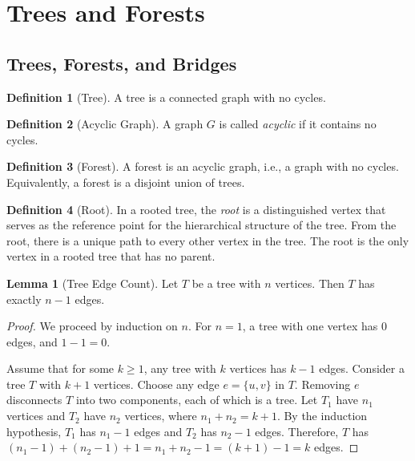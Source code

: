\documentclass{article}
\theoremstyle{definition}
\newtheorem{lemma}{Lemma}
\newtheorem{definition}{Definition}
\begin{document}
\pagebreak
\section{Trees and Forests}

\subsection{Trees, Forests, and Bridges}

\begin{definition}[Tree]
A tree is a connected graph with no cycles.
\end{definition}

\begin{definition}[Acyclic Graph]
A graph $G$ is called \textit{acyclic} if it contains no cycles.
\end{definition}

\begin{definition}[Forest]
A forest is an acyclic graph, i.e., a graph with no cycles. Equivalently, a forest is a disjoint union of trees.
\end{definition}

\begin{definition}[Root]
In a rooted tree, the \textit{root} is a distinguished vertex that serves as the reference point for the hierarchical structure of the tree. From the root, there is a unique path to every other vertex in the tree. The root is the only vertex in a rooted tree that has no parent.
\end{definition}

\begin{lemma}[Tree Edge Count]
Let $T$ be a tree with $n$ vertices. Then $T$ has exactly $n-1$ edges.
\end{lemma}


\begin{proof}
We proceed by induction on $n$. For $n=1$, a tree with one vertex has 0 edges, and $1-1 = 0$.

Assume that for some $k \geq 1$, any tree with $k$ vertices has $k-1$ edges. Consider a tree $T$ with $k+1$ vertices. Choose any edge $e = \{u, v\}$ in $T$. Removing $e$ disconnects $T$ into two components, each of which is a tree. Let $T_1$ have $n_1$ vertices and $T_2$ have $n_2$ vertices, where $n_1 + n_2 = k+1$. By the induction hypothesis, $T_1$ has $n_1 - 1$ edges and $T_2$ has $n_2 - 1$ edges. Therefore, $T$ has $(n_1 - 1) + (n_2 - 1) + 1 = n_1 + n_2 - 1 = (k+1) - 1 = k$ edges.
\end{proof}
\end{document}
